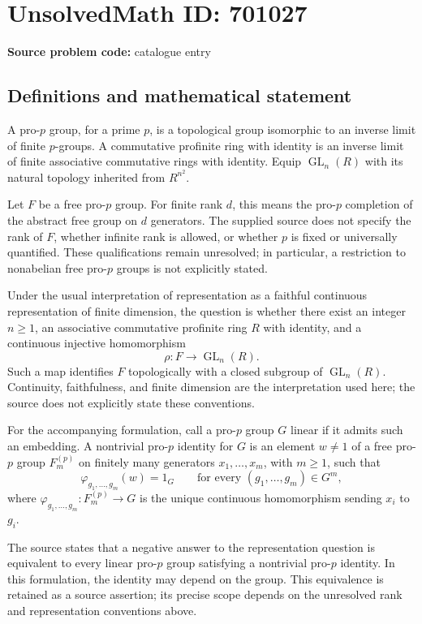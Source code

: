 \documentclass[11pt]{article}
\begin{document}
\section*{UnsolvedMath ID: 701027}
\textbf{Source problem code:} catalogue entry
\subsection{Definitions and mathematical statement}
A pro-$p$ group, for a prime $p$, is a topological group isomorphic to an inverse limit of finite $p$-groups. A commutative profinite ring with identity is an inverse limit of finite associative commutative rings with identity. Equip $\operatorname{GL}_n(R)$ with its natural topology inherited from $R^{n^2}$.

Let $F$ be a free pro-$p$ group. For finite rank $d$, this means the pro-$p$ completion of the abstract free group on $d$ generators. The supplied source does not specify the rank of $F$, whether infinite rank is allowed, or whether $p$ is fixed or universally quantified. These qualifications remain unresolved; in particular, a restriction to nonabelian free pro-$p$ groups is not explicitly stated.

Under the usual interpretation of representation as a faithful continuous representation of finite dimension, the question is whether there exist an integer $n\geq 1$, an associative commutative profinite ring $R$ with identity, and a continuous injective homomorphism
\[
\rho:F\longrightarrow\operatorname{GL}_n(R).
\]
Such a map identifies $F$ topologically with a closed subgroup of $\operatorname{GL}_n(R)$. Continuity, faithfulness, and finite dimension are the interpretation used here; the source does not explicitly state these conventions.

For the accompanying formulation, call a pro-$p$ group $G$ linear if it admits such an embedding. A nontrivial pro-$p$ identity for $G$ is an element $w\neq 1$ of a free pro-$p$ group $F_m^{(p)}$ on finitely many generators $x_1,\ldots,x_m$, with $m\geq 1$, such that
\[
\varphi_{g_1,\ldots,g_m}(w)=1_G
\qquad\text{for every }(g_1,\ldots,g_m)\in G^m,
\]
where $\varphi_{g_1,\ldots,g_m}:F_m^{(p)}\to G$ is the unique continuous homomorphism sending $x_i$ to $g_i$.

The source states that a negative answer to the representation question is equivalent to every linear pro-$p$ group satisfying a nontrivial pro-$p$ identity. In this formulation, the identity may depend on the group. This equivalence is retained as a source assertion; its precise scope depends on the unresolved rank and representation conventions above.
\end{document}
